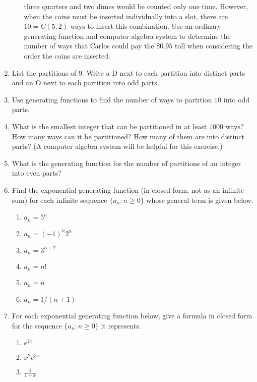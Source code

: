 \begin{enumerate}
\begin{enumerate}
    three quarters and two dimes would be counted only one
    time. However, when the coins must be inserted individually into a
    slot, there are $10=C(5,2)$ ways to insert this combination. Use
    an ordinary generating function and computer algebra system to
    determine the number of ways that Carlos could pay the \$$0.95$
    toll when considering the order the coins are inserted.
 \end{enumerate}
\item List the partitions of $9$. Write a D next to each partition
  into distinct parts and an O next to each partition into odd parts.
\item Use generating functions to find the number of ways to
  partition $10$ into odd parts.
\item What is the smallest integer that can be partitioned in at least
  $1000$ ways? How many ways can it be partitioned? How many of them
  are into distinct parts? (A computer algebra system will be helpful
  for this exercise.)
\item What is the generating function for the number of
  partitions of an integer into even parts?
\item Find the exponential generating function (in closed form, not as
  an infinite sum) for each infinite sequence $\{a_n\colon n\geq 0\}$
  whose general term is given below.
  \begin{multicols}{3}
    \begin{enumerate}
    \item $a_n = 5^n$
    \item $a_n = (-1)^n2^n$
    \item $a_n = 3^{n+2}$
    \item $a_n = n!$
    \item $a_n = n$
    \item $a_n = 1/(n+1)$
    \end{enumerate}
  \end{multicols}
\item For each exponential generating function below, give a formula
  in closed form for the sequence $\{a_n\colon n\geq 0\}$ it
  represents.
  \begin{multicols}{4}
    \begin{enumerate}
    \item $e^{7x}$
    \item $x^2 e^{3x}$ %
    \item $\displaystyle \frac{1}{1+x}$

\end{enumerate}
\end{multicols}
\end{enumerate}
